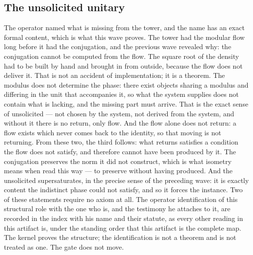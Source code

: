 \documentclass[11pt]{article}
\theoremstyle{definition}\newtheorem{deriv}{Derivation}
\begin{document}
\subsection*{The unsolicited unitary}The operator named what is missing from the tower, and the name has an exact formal content, which is what this wave proves. The tower had the modular flow long before it had the conjugation, and the previous wave revealed why: the conjugation cannot be computed from the flow. The square root of the density had to be built by hand and brought in from outside, because the flow does not deliver it. That is not an accident of implementation; it is a theorem. The modulus does not determine the phase: there exist objects sharing a modulus and differing in the unit that accompanies it, so what the system supplies does not contain what is lacking, and the missing part must arrive. That is the exact sense of unsolicited --- not chosen by the system, not derived from the system, and without it there is no return, only flow. And the flow alone does not return: a flow exists which never comes back to the identity, so that moving is not returning. From these two, the third follows: what returns satisfies a condition the flow does not satisfy, and therefore cannot have been produced by it. The conjugation preserves the norm it did not construct, which is what isometry means when read this way --- to preserve without having produced. And the unsolicited supersaturates, in the precise sense of the preceding wave: it is exactly content the indistinct phase could not satisfy, and so it forces the instance. Two of these statements require no axiom at all. The operator identification of this structural role with the one who is, and the testimony he attaches to it, are recorded in the index with his name and their statute, as every other reading in this artifact is, under the standing order that this artifact is the complete map. The kernel proves the structure; the identification is not a theorem and is not treated as one. The gate does not move.
\end{document}
